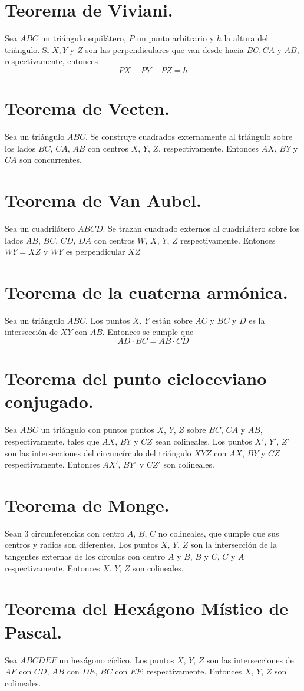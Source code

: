 \documentclass[12pt,a4paper,oneside]{book}
\begin{document}
\section{Teorema de Viviani.}
Sea $ABC$ un triángulo equilátero, $P$ un punto arbitrario y $h$ la altura del triángulo. Si $X, Y$ y $Z$ son las perpendiculares que van desde hacia $BC, CA$ y $AB$, respectivamente, entonces $$PX + PY +PZ = h$$
\section{Teorema de Vecten.}
Sea un triángulo $ABC$. Se construye cuadrados externamente al triángulo sobre los lados $BC$, $CA$, $AB$ con centros $X$, $Y$, $Z$, respectivamente. Entonces $AX$, $BY$ y $CA$ son concurrentes.
\section{Teorema de Van Aubel.}
Sea un cuadrilátero $ABCD$. Se trazan cuadrado externos al cuadrilátero sobre los lados $AB$, $BC$, $CD$, $DA$ con centros $W$, $X$, $Y$, $Z$ respectivamente. Entonces $WY= XZ$ y $WY$ es perpendicular $XZ$
\section{Teorema de la cuaterna armónica.}
Sea un triángulo $ABC$. Los puntos $X$, $Y$ están sobre ${AC}$ y ${BC}$ y $D$ es la intersección de $XY$ con $AB$. Entonces se cumple que $$AD \cdot BC= AB \cdot CD$$
\section{Teorema del punto cicloceviano conjugado.}
Sea $ABC$ un triángulo con puntos puntos $X$, $Y$, $Z$ sobre ${BC}$, ${CA}$ y ${AB}$, respectivamente, tales que $AX$, $BY$ y $CZ$ sean colineales. Los puntos $X'$, $Y'$, $Z'$ son las intersecciones del circuncírculo del triángulo $XYZ$ con $AX$, $BY$ y $CZ$ respectivamente. Entonces $AX'$, $BY'$ y $CZ'$ son colineales.
\section{Teorema de Monge.}
Sean 3 circunferencias con centro $A$, $B$, $C$ no colineales, que cumple que sus centros y radios son diferentes. Los puntos $X$, $Y$, $Z$ son la intersección de la tangentes externas de los círculos con centro $A$ y $B$, $B$ y $C$, $C$ y $A$ respectivamente. Entonces $X$. $Y$, $Z$ son colineales. 
\section{Teorema del Hexágono Místico de Pascal.}
Sea $ABCDEF$ un hexágono cíclico. Los puntos $X$, $Y$, $Z$ son las intersecciones de $AF$ con $CD$, $AB$ con $DE$, $BC$ con $EF$; respectivamente. Entonces $X$, $Y$, $Z$ son colineales.
\end{document}
